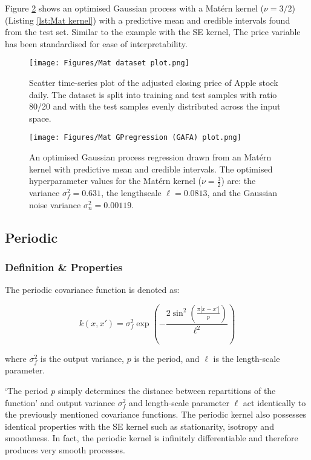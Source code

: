 \documentclass[12pt,a4paper]{article}
\begin{document}
Figure \ref{fig:Mat GPregression}   shows an optimised Gaussian process with a Mat\'{e}rn kernel (\(\nu = 3/2\)) (Listing \ref{lst:Mat kernel}) with a predictive mean and credible intervals found from the test set. Similar to the example with the SE kernel, The price variable has been standardised for ease of interpretability. 

\begin{figure}[h]
\centering
\texttt{[image: Figures/Mat dataset plot.png]} 
\caption{Scatter time-series plot of the adjusted closing price of Apple stock daily. The dataset is split into training and test samples with ratio 80/20 and with the test samples evenly distributed across the input space.} \label{fig:Mat dataset plot}
\end{figure}

\begin{figure}[h]
\centering
\texttt{[image: Figures/Mat GPregression (GAFA) plot.png]} 
\caption{An optimised Gaussian process regression drawn from an Mat\'{e}rn kernel with predictive mean and credible intervals. The optimised hyperparameter values for the Mat\'{e}rn kernel (\( \nu = \frac{3}{2} \)) are: the variance \(\sigma_f^2 = 0.631\), the lengthscale \(\ell = 0.0813\), and the Gaussian noise variance \(\sigma_n^2 = 0.00119\).} \label{fig:Mat GPregression}
\end{figure}

\newpage
\subsection{Periodic}
\label{sec:Periodic}
\subsubsection{Definition \& Properties}

The periodic covariance function is denoted as:

\begin{equation}
k(x,x') = \sigma_f^2 \exp\left(-\frac{2 \sin^2\left(\frac{\pi |x - x'|}{p}\right)}{\ell^2}\right)
\end{equation}

where \( \sigma_f^2 \) is the output variance, \( p \) is the period, and \( \ell \) is the length-scale parameter.

`The period \(p\) simply determines the distance between repartitions of the function' \citet{torontoKernelCookbook} and output variance \( \sigma_f^2 \) and length-scale parameter \( \ell \) act identically to the previously mentioned covariance functions. The periodic kernel also possesses identical properties with the SE kernel such as stationarity, isotropy and smoothness. In fact, the periodic kernel is infinitely differentiable and therefore produces very smooth processes. 
\end{document}
